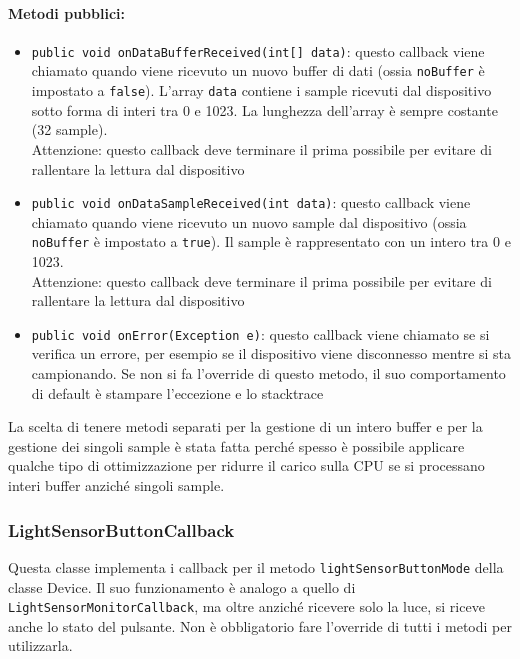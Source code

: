 \paragraph{Metodi pubblici:}\begin{itemize}
	\item \texttt{public void onDataBufferReceived(int[] data){}}: questo callback viene chiamato quando viene ricevuto un nuovo buffer di dati (ossia \texttt{noBuffer} è impostato a \texttt{false}). L'array \texttt{data} contiene i sample ricevuti dal dispositivo sotto forma di interi tra 0 e 1023. La lunghezza dell'array è sempre costante (32 sample).\\
	Attenzione: questo callback deve terminare il prima possibile per evitare di rallentare la lettura dal dispositivo
	\item \texttt{public void onDataSampleReceived(int data){}}: questo callback viene chiamato quando viene ricevuto un nuovo sample dal dispositivo (ossia \texttt{noBuffer} è impostato a \texttt{true}). Il sample è rappresentato con un intero tra 0 e 1023.\\
	Attenzione: questo callback deve terminare il prima possibile per evitare di rallentare la lettura dal dispositivo
	\item \texttt{public void onError(Exception e)}: questo callback viene chiamato se si verifica un errore, per esempio se il dispositivo viene disconnesso mentre si sta campionando. Se non si fa l'override di questo metodo, il suo comportamento di default è stampare l'eccezione e lo stacktrace
\end{itemize}

La scelta di tenere metodi separati per la gestione di un intero buffer e per la gestione dei singoli sample è stata fatta perché spesso è possibile applicare qualche tipo di ottimizzazione per ridurre il carico sulla CPU se si processano interi buffer anziché singoli sample.

\subsubsection{LightSensorButtonCallback}
Questa classe implementa i callback per il metodo \texttt{lightSensorButtonMode} della classe Device. Il suo funzionamento è analogo a quello di \texttt{LightSensorMonitorCallback}, ma oltre anziché ricevere solo la luce, si riceve anche lo stato del pulsante. Non è obbligatorio fare l'override di tutti i metodi per utilizzarla.

